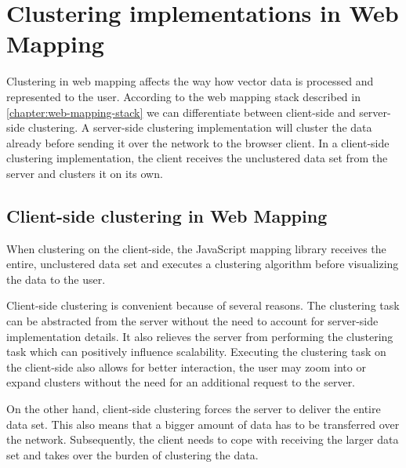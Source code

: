 
%
%

\section{Clustering implementations in Web Mapping}

Clustering in web mapping affects the way how vector data is processed and represented to the user.  According to the web mapping stack described in \ref{chapter:web-mapping-stack} we can differentiate between client-side and server-side clustering. A server-side clustering implementation will cluster the data already before sending it over the network to the browser client. In a client-side clustering implementation, the client receives the unclustered data set from the server and clusters it on its own.

\subsection{Client-side clustering in Web Mapping}

When clustering on the client-side, the JavaScript mapping library receives the entire, unclustered data set and executes a clustering algorithm before visualizing the data to the user.

Client-side clustering is convenient because of several reasons. The clustering task can be abstracted from the server without the need to account for server-side implementation details. It also relieves the server from performing the clustering task which can positively influence scalability. Executing the clustering task on the client-side also allows for better interaction, the user may zoom into or expand clusters without the need for an additional request to the server. 

On the other hand, client-side clustering forces the server to deliver the entire data set. This also means that a bigger amount of data has to be transferred over the network. Subsequently, the client needs to cope with receiving the larger data set and takes over the burden of clustering the data. 

